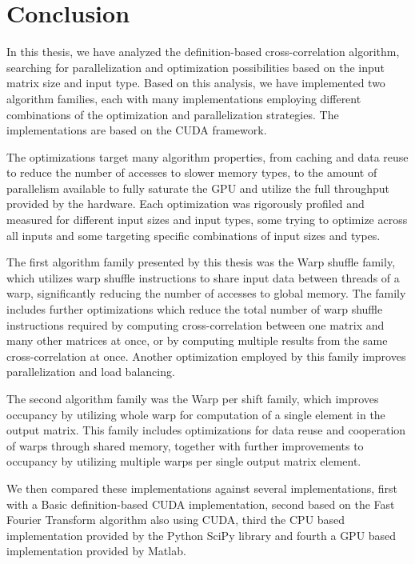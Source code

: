 \chapter*{Conclusion}
 
In this thesis, we have analyzed the definition-based cross-correlation algorithm, searching for parallelization and optimization possibilities based on the input matrix size and input type. Based on this analysis, we have implemented two algorithm families, each with many implementations employing different combinations of the optimization and parallelization strategies. The implementations are based on the CUDA framework.

The optimizations target many algorithm properties, from caching and data reuse to reduce the number of accesses to slower memory types, to the amount of parallelism available to fully saturate the GPU and utilize the full throughput provided by the hardware. Each optimization was rigorously profiled and measured for different input sizes and input types, some trying to optimize across all inputs and some targeting specific combinations of input sizes and types. 

The first algorithm family presented by this thesis was the Warp shuffle family, which utilizes warp shuffle instructions to share input data between threads of a warp, significantly reducing the number of accesses to global memory. The family includes further optimizations which reduce the total number of warp shuffle instructions required by computing cross-correlation between one matrix and many other matrices at once, or by computing multiple results from the same cross-correlation at once.  Another optimization employed by this family improves parallelization and load balancing. 
 
The second algorithm family was the Warp per shift family, which improves occupancy by utilizing whole warp for computation of a single element in the output matrix. This family includes optimizations for data reuse and cooperation of warps through shared memory, together with further improvements to occupancy by utilizing multiple warps per single output matrix element.

We then compared these implementations against several implementations, first with a Basic definition-based CUDA  implementation, second based on the Fast Fourier Transform algorithm also using CUDA, third the CPU based implementation provided by the Python SciPy library and fourth a GPU based implementation provided by Matlab. 

